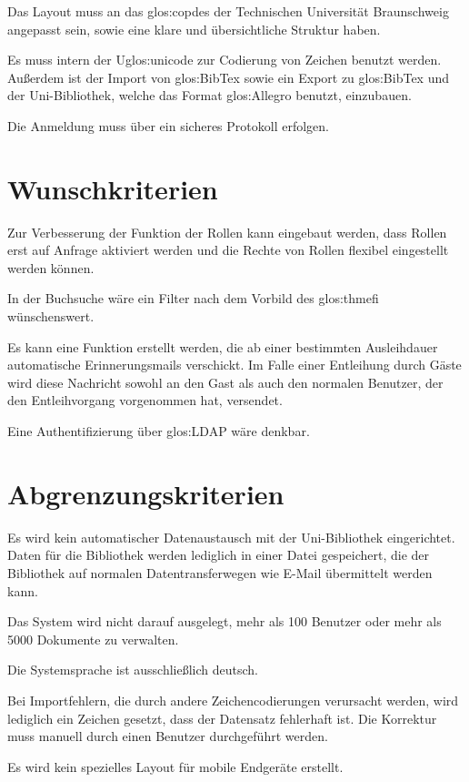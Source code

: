Das Layout muss an das \gls{glos:copdes} der Technischen Universität Braunschweig angepasst sein, sowie eine klare und übersichtliche Struktur haben. 

Es muss intern der U\gls{glos:unicode} zur Codierung von Zeichen benutzt werden. Außerdem ist der Import von \gls{glos:BibTex} sowie ein Export zu \gls{glos:BibTex} und der Uni-Bibliothek, welche das Format \gls{glos:Allegro} benutzt, einzubauen. 

Die Anmeldung muss über ein sicheres Protokoll erfolgen.

\section{Wunschkriterien}
Zur Verbesserung der Funktion der Rollen kann eingebaut werden, dass Rollen erst auf Anfrage aktiviert werden und die Rechte von Rollen flexibel eingestellt werden können. 

In der Buchsuche wäre ein Filter nach dem Vorbild des \gls{glos:thmefi} wünschenswert. 

Es kann eine Funktion erstellt werden, die ab einer bestimmten Ausleihdauer automatische Erinnerungsmails verschickt. Im Falle einer Entleihung durch Gäste wird diese Nachricht sowohl an den Gast als auch den normalen Benutzer, der den Entleihvorgang vorgenommen hat, versendet. 

Eine Authentifizierung über \gls{glos:LDAP} wäre denkbar.

\section{Abgrenzungskriterien}
Es wird kein automatischer Datenaustausch mit der Uni-Bibliothek eingerichtet. Daten für die Bibliothek werden lediglich in einer Datei gespeichert, die der Bibliothek auf normalen Datentransferwegen wie E-Mail übermittelt werden kann. 

Das System wird nicht darauf ausgelegt, mehr als 100 Benutzer oder mehr als 5000 Dokumente zu verwalten.

Die Systemsprache ist ausschließlich deutsch.

Bei Importfehlern, die durch andere Zeichencodierungen verursacht werden, wird lediglich ein Zeichen gesetzt, dass der Datensatz fehlerhaft ist. Die Korrektur muss manuell durch einen Benutzer durchgeführt werden.

Es wird kein spezielles Layout für mobile Endgeräte erstellt.